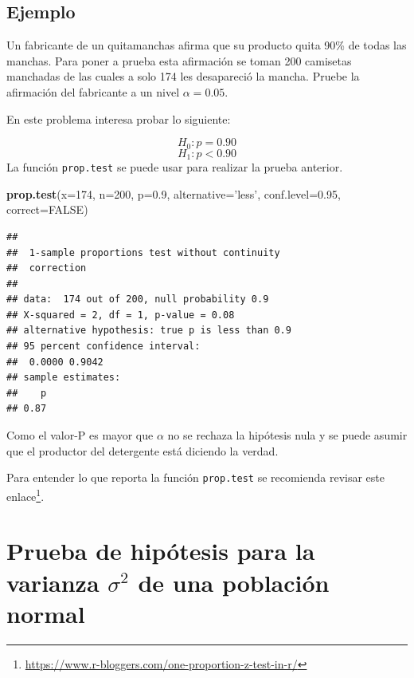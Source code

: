 \documentclass[10pt,]{krantz}
\makeatletter
\newenvironment{Shaded}{\begin{snugshade}}{\end{snugshade}}
\newcommand{\KeywordTok}[1]{\textcolor[rgb]{0.13,0.29,0.53}{\textbf{{#1}}}}
\newcommand{\DataTypeTok}[1]{\textcolor[rgb]{0.13,0.29,0.53}{{#1}}}
\newcommand{\DecValTok}[1]{\textcolor[rgb]{0.00,0.00,0.81}{{#1}}}
\newcommand{\FloatTok}[1]{\textcolor[rgb]{0.00,0.00,0.81}{{#1}}}
\newcommand{\StringTok}[1]{\textcolor[rgb]{0.31,0.60,0.02}{{#1}}}
\newcommand{\OtherTok}[1]{\textcolor[rgb]{0.56,0.35,0.01}{{#1}}}
\newcommand{\NormalTok}[1]{{#1}}
\renewcommand{\href}[2]{#2\footnote{\url{#1}}}
\newenvironment{kframe}{%
\medskip{}
\setlength{\fboxsep}{.8em}
 \def\at@end@of@kframe{}%
 \ifinner\ifhmode%
  \def\at@end@of@kframe{\end{minipage}}%
  \begin{minipage}{\columnwidth}%
 \fi\fi%
 \def\FrameCommand##1{\hskip\@totalleftmargin \hskip-\fboxsep
 \colorbox{shadecolor}{##1}\hskip-\fboxsep
     \hskip-\linewidth \hskip-\@totalleftmargin \hskip\columnwidth}%
 \MakeFramed {\advance\hsize-\width
   \@totalleftmargin\z@ \linewidth\hsize
   \@setminipage}}%
 {\par\unskip\endMakeFramed%
 \at@end@of@kframe}
\renewenvironment{Shaded}{\begin{kframe}}{\end{kframe}}
\makeatother
\begin{document}
\subsection*{Ejemplo}\label{ejemplo-63}


Un fabricante de un quitamanchas afirma que su producto quita 90\% de
todas las manchas. Para poner a prueba esta afirmación se toman 200
camisetas manchadas de las cuales a solo 174 les desapareció la mancha.
Pruebe la afirmación del fabricante a un nivel \(\alpha=0.05\).

En este problema interesa probar lo siguiente:

\[H_0: p = 0.90\] \[H_1: p < 0.90\] La función \texttt{prop.test} se
puede usar para realizar la prueba anterior.

\begin{Shaded}
\begin{Highlighting}[]
\KeywordTok{prop.test}\NormalTok{(}\DataTypeTok{x=}\DecValTok{174}\NormalTok{, }\DataTypeTok{n=}\DecValTok{200}\NormalTok{, }\DataTypeTok{p=}\FloatTok{0.9}\NormalTok{, }\DataTypeTok{alternative=}\StringTok{'less'}\NormalTok{,}
          \DataTypeTok{conf.level=}\FloatTok{0.95}\NormalTok{, }\DataTypeTok{correct=}\OtherTok{FALSE}\NormalTok{)}
\end{Highlighting}
\end{Shaded}

\begin{verbatim}
## 
##  1-sample proportions test without continuity
##  correction
## 
## data:  174 out of 200, null probability 0.9
## X-squared = 2, df = 1, p-value = 0.08
## alternative hypothesis: true p is less than 0.9
## 95 percent confidence interval:
##  0.0000 0.9042
## sample estimates:
##    p 
## 0.87
\end{verbatim}

Como el valor-P es mayor que \(\alpha\) no se rechaza la hipótesis nula
y se puede asumir que el productor del detergente está diciendo la
verdad.

Para entender lo que reporta la función \texttt{prop.test} se recomienda
revisar este
\href{https://www.r-bloggers.com/one-proportion-z-test-in-r/}{enlace}.

\section{\texorpdfstring{Prueba de hipótesis para la varianza
\(\sigma^2\) de una población
normal}{Prueba de hipótesis para la varianza \textbackslash{}sigma\^{}2 de una población normal}}\label{prueba-de-hipotesis-para-la-varianza-sigma2-de-una-poblacion-normal}
\end{document}
